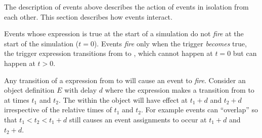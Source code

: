 The description of events above describes the action of events in
isolation from each other.  This section describes how events
interact.

Events whose  expression is true at the start of a
simulation do not \emph{fire} at the start of the simulation ($t =
0$).  Events \emph{fire} only when the trigger \emph{becomes}
true, \ie the trigger expression transitions from  to
, which cannot happen at $t = 0$ but can happen at $t >
0$.

Any transition of a  expression from  to
 will cause an event to \emph{fire}.  Consider an \Event
object definition $E$ with delay $d$ where the 
expression makes a transition from  to  at
times $t_1$ and $t_2$.  The \EventAssignment within the \Event
object will have effect at $t_1+d$ and $t_2+d$ irrespective of the
relative times of $t_1$ and $t_2$. For example events can
``overlap'' so that $t_1 < t_2 < t_1+d$ still causes an event
assignments to occur at $t_1+d$ and $t_2+d$.

